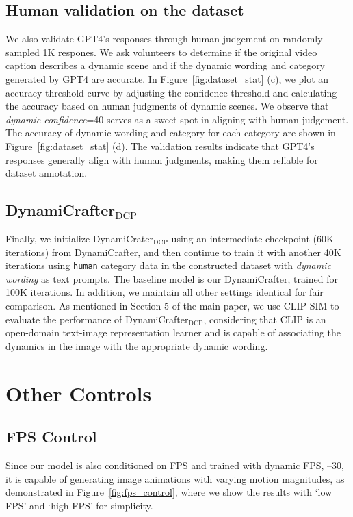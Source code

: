 \subsection{Human validation on the dataset}
We also validate GPT4's responses through human judgement on randomly sampled 1K respones. We ask volunteers to determine if the original video caption describes a dynamic scene and if the dynamic wording and category generated by GPT4 are accurate. In Figure~\ref{fig:dataset_stat} (c), we plot an accuracy-threshold curve by adjusting the confidence threshold and calculating the accuracy based on human judgments of dynamic scenes. We observe that \emph{dynamic confidence}=40 serves as a sweet spot in aligning with human judgement. The accuracy of dynamic wording and category for each category are shown in Figure~\ref{fig:dataset_stat} (d). The validation results indicate that GPT4's responses generally align with human judgments, making them reliable for dataset annotation.

\subsection{DynamiCrafter$_\text{DCP}$}
Finally, we initialize DynamiCrater$_\text{DCP}$ using an intermediate checkpoint (60K iterations) from DynamiCrafter, and then continue to train it with another 40K iterations using \texttt{human} category data in the constructed dataset with \emph{dynamic wording} as text prompts. The baseline model is our DynamiCrafter, trained for 100K iterations. In addition, we maintain all other settings identical for fair comparison. As mentioned in Section 5 of the main paper, we use CLIP-SIM to evaluate the performance of DynamiCrafter$_\text{DCP}$, considering that CLIP is an open-domain text-image representation learner and is capable of associating the dynamics in the image with the appropriate dynamic wording.


\section{Other Controls}
\label{sec:control}


\subsection{FPS Control}
Since our model is also conditioned on FPS and trained with dynamic FPS, --30, it is capable of generating image animations with varying motion magnitudes, as demonstrated in Figure~\ref{fig:fps_control}, where we show the results with `low FPS' and `high FPS' for simplicity.


